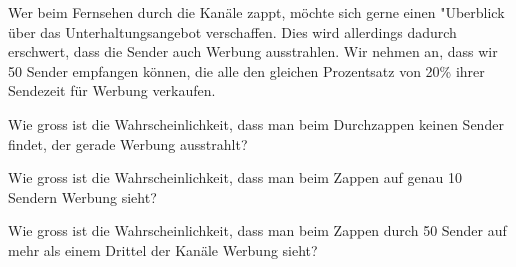 Wer beim Fernsehen durch die Kanäle zappt, möchte sich gerne einen
"Uberblick über das Unterhaltungsangebot verschaffen.  Dies wird allerdings dadurch erschwert, dass die Sender
auch Werbung ausstrahlen. Wir nehmen an, dass wir 50 Sender empfangen
können, die alle den gleichen Prozentsatz von 20\%
ihrer Sendezeit für Werbung verkaufen.
\begin{teilaufgaben}
\item
Wie gross ist die Wahrscheinlichkeit, dass man beim Durchzappen
keinen Sender findet, der gerade Werbung ausstrahlt?
\item
Wie gross ist die Wahrscheinlichkeit, dass man beim Zappen auf
genau 10 Sendern Werbung sieht?
\item
Wie gross ist die Wahrscheinlichkeit, dass man beim Zappen durch
50 Sender auf mehr als einem Drittel der Kanäle Werbung sieht?
\end{teilaufgaben}



